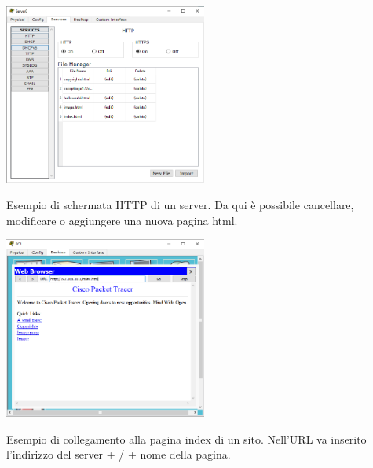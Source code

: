 \begin{sfigure}
    \centering
    \captionsetup{type=figure}
    \includegraphics[width=0.5\textwidth]{images/06.servizi-rete/http/01.conf-server.png}
    \caption{Esempio di schermata HTTP di un server. Da qui è possibile cancellare, modificare o aggiungere una nuova pagina html.}
    \label{fig:http-conf}
\end{sfigure}

\begin{sfigure}
    \centering
    \captionsetup{type=figure}
    \includegraphics[width=0.5\textwidth]{images/06.servizi-rete/http/02.conf-client.png}
    \caption{Esempio di collegamento alla pagina index di un sito. Nell’URL va inserito l’indirizzo del server + / + nome della pagina.}
    \label{fig:http-test}
\end{sfigure}